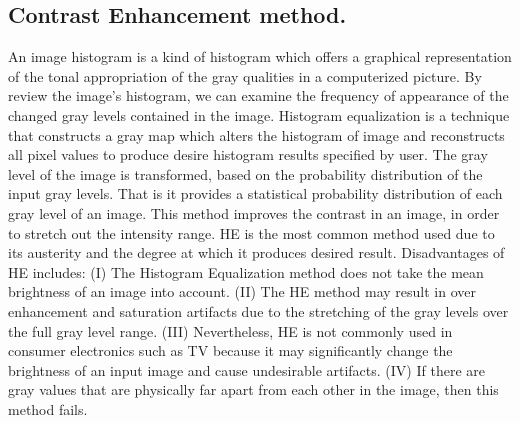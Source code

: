\documentclass[doctor,english,listoffigures,listoftables]{thesis-uestc}
\begin{document}
\subsection{Contrast Enhancement method.} 
An image histogram is a kind of histogram which offers a graphical representation of the tonal appropriation of the gray qualities in a computerized picture. By review the image's histogram, we can examine the frequency of appearance of the changed gray levels contained in the image. Histogram equalization is a technique that constructs a gray map which alters the histogram of image and reconstructs all pixel values to produce desire histogram results specified by user. The gray level of the image is transformed, based on the probability distribution of the input gray levels. That is it provides a statistical probability distribution of each gray level of an image. This method improves the contrast in an image, in order to stretch out the intensity range. HE is the most common method used due to its austerity and the degree at which it produces desired result. Disadvantages of HE includes: (I) The Histogram Equalization method does not take the mean brightness of an image into account. (II) The HE method may result in over enhancement and saturation artifacts due to the stretching of the gray levels over the full gray level range. (III) Nevertheless, HE is not commonly used in consumer electronics such as TV because it may significantly change the brightness of an input image and cause undesirable artifacts. (IV) If there are gray values that are physically far apart from each other in the image, then this method fails. 
\end{document}
